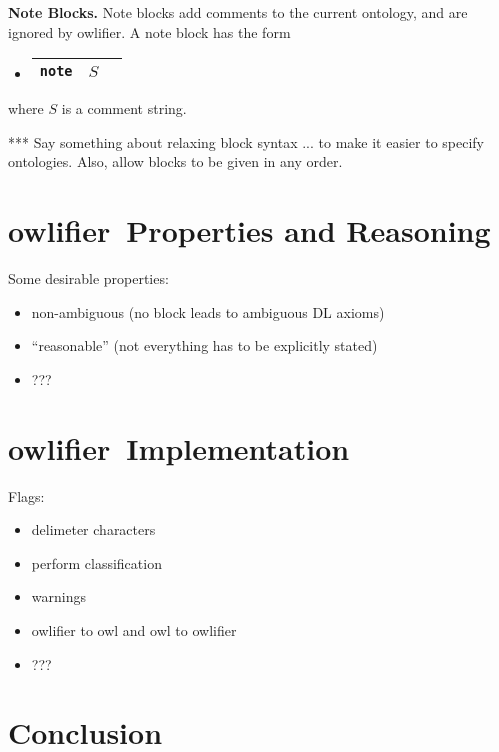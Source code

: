 \documentclass[preprint,number]{elsarticle}
\newcommand{\owlifier}{\textsf{owlifier}}
\newcommand{\myblock}[1]{\vspace{12pt}\noindent\textbf{#1}}
\begin{document}
\myblock{Note Blocks.} Note blocks add comments to the current
ontology, and are ignored by \owlifier.  A note block has the form
\begin{itemize}
\item[]
  \begin{tabular}{|l|l|l|}\hline \texttt{note} & $S$
\\ \hline
  \end{tabular}
\end{itemize}
where $S$ is a comment string.


*** Say something about relaxing block syntax ... to make it easier to
specify ontologies. Also, allow blocks to be given in any order.


\section{\owlifier\ Properties and Reasoning}
\label{sec:properties}


Some desirable properties: 
\begin{itemize}
\item non-ambiguous (no block leads to ambiguous DL axioms)
\item ``reasonable'' (not everything has to be explicitly stated)
\item ???
\end{itemize}

\section{\owlifier\ Implementation}
\label{sec:implementation}

Flags: 
\begin{itemize}
\item delimeter characters 
\item perform classification
\item warnings
\item owlifier to owl and owl to owlifier
\item ??? 
\end{itemize}


\section{Conclusion}
\label{sec:conclusion}



%


\end{document}
